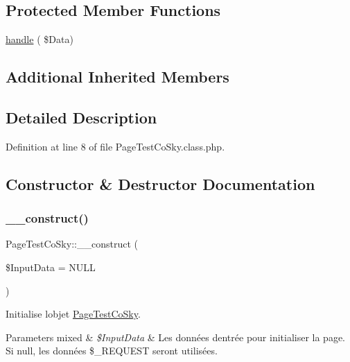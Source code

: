 \subsection*{Protected Member Functions}
\begin{DoxyCompactItemize}
\item 
\hyperlink{class_page_test_co_sky_a5fc9b3bf4014917cca71917a46f82bfc}{handle} ( \$Data)
\end{DoxyCompactItemize}
\subsection*{Additional Inherited Members}


\subsection{Detailed Description}


Definition at line 8 of file Page\+Test\+Co\+Sky.\+class.\+php.



\subsection{Constructor \& Destructor Documentation}
\mbox{\label{class_page_test_co_sky_a2c879f6b4c2273cb0a6e8a37e804b882}} 
\subsubsection{\texorpdfstring{\+\_\+\+\_\+construct()}{\_\_construct()}}
{\footnotesize\ttfamily Page\+Test\+Co\+Sky\+::\+\_\+\+\_\+construct (\begin{DoxyParamCaption}\item[{}]{\$\+Input\+Data = {\ttfamily NULL} }\end{DoxyParamCaption})}

Initialise l\textquotesingle{}objet \hyperlink{class_page_test_co_sky}{Page\+Test\+Co\+Sky}.


\begin{DoxyParams}[1]{Parameters}
mixed & {\em \$\+Input\+Data} & Les données d\textquotesingle{}entrée pour initialiser la page. Si null, les données \$\+\_\+\+R\+E\+Q\+U\+E\+ST seront utilisées. \\
\hline
\end{DoxyParams}


